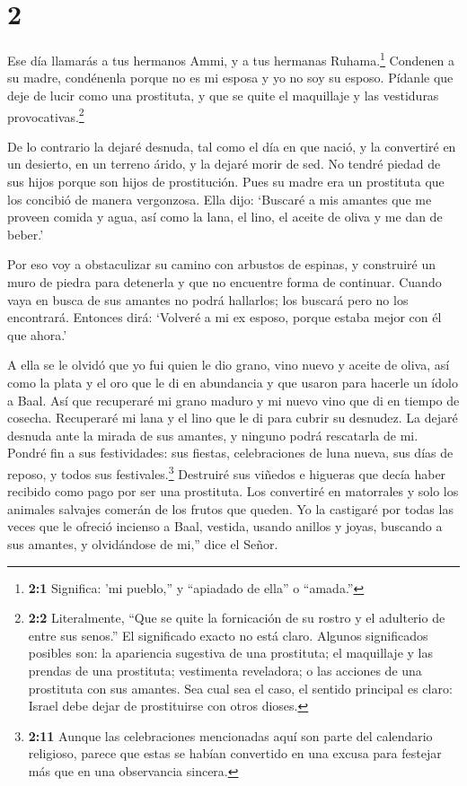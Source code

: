 \hypertarget{section-1}{%
\section{2}\label{section-1}}

 Ese día llamarás a tus hermanos Ammi, y a tus hermanas
Ruhama.\footnote{\textbf{2:1} Significa: 'mi pueblo,'' y ``apiadado de
  ella'' o ``amada.''}  Condenen a su madre, condénenla
porque no es mi esposa y yo no soy su esposo. Pídanle que deje de lucir
como una prostituta, y que se quite el maquillaje y las vestiduras
provocativas.\footnote{\textbf{2:2} Literalmente, ``Que se quite la
  fornicación de su rostro y el adulterio de entre sus senos.'' El
  significado exacto no está claro. Algunos significados posibles son:
  la apariencia sugestiva de una prostituta; el maquillaje y las prendas
  de una prostituta; vestimenta reveladora; o las acciones de una
  prostituta con sus amantes. Sea cual sea el caso, el sentido principal
  es claro: Israel debe dejar de prostituirse con otros dioses.}

 De lo contrario la dejaré desnuda, tal como el día en que
nació, y la convertiré en un desierto, en un terreno árido, y la dejaré
morir de sed.  No tendré piedad de sus hijos porque son
hijos de prostitución.  Pues su madre era un prostituta que
los concibió de manera vergonzosa. Ella dijo: `Buscaré a mis amantes que
me proveen comida y agua, así como la lana, el lino, el aceite de oliva
y me dan de beber.'

 Por eso voy a obstaculizar su camino con arbustos de
espinas, y construiré un muro de piedra para detenerla y que no
encuentre forma de continuar.  Cuando vaya en busca de sus
amantes no podrá hallarlos; los buscará pero no los encontrará. Entonces
dirá: `Volveré a mi ex esposo, porque estaba mejor con él que ahora.'

 A ella se le olvidó que yo fui quien le dio grano, vino
nuevo y aceite de oliva, así como la plata y el oro que le di en
abundancia y que usaron para hacerle un ídolo a Baal.  Así
que recuperaré mi grano maduro y mi nuevo vino que di en tiempo de
cosecha. Recuperaré mi lana y el lino que le di para cubrir su desnudez.
 La dejaré desnuda ante la mirada de sus amantes, y ninguno
podrá rescatarla de mi.  Pondré fin a sus festividades: sus
fiestas, celebraciones de luna nueva, sus días de reposo, y todos sus
festivales.\footnote{\textbf{2:11} Aunque las celebraciones mencionadas
  aquí son parte del calendario religioso, parece que estas se habían
  convertido en una excusa para festejar más que en una observancia
  sincera.}  Destruiré sus viñedos e higueras que decía
haber recibido como pago por ser una prostituta. Los convertiré en
matorrales y solo los animales salvajes comerán de los frutos que
queden.  Yo la castigaré por todas las veces que le ofreció
incienso a Baal, vestida, usando anillos y joyas, buscando a sus
amantes, y olvidándose de mi,'' dice el Señor.

